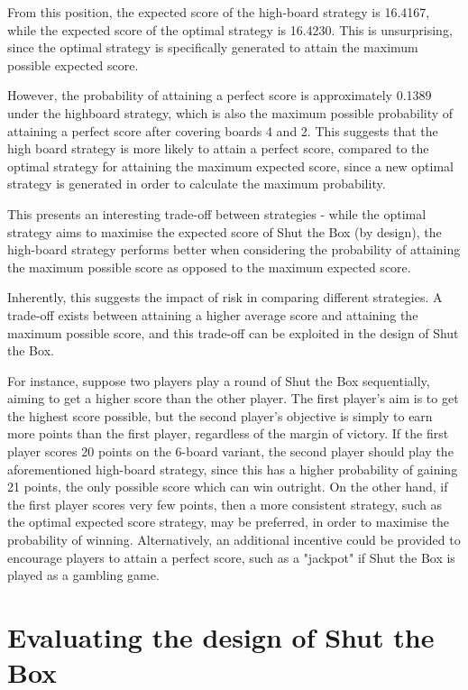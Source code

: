 \begin{example}
From this position, the expected score of the high-board strategy is 16.4167, while the expected score of the optimal strategy is 16.4230. This is unsurprising, since the optimal strategy is specifically generated to attain the maximum possible expected score.

However, the probability of attaining a perfect score is approximately 0.1389 under the highboard strategy, which is also the maximum possible probability of attaining a perfect score after covering boards 4 and 2. This suggests that the high board strategy is more likely to attain a perfect score, compared to the optimal strategy for attaining the maximum expected score, since a new optimal strategy is generated in order to calculate the maximum probability.

\end{example}

This presents an interesting trade-off between strategies - while the optimal strategy aims to maximise the expected score of Shut the Box (by design), the high-board strategy performs better when considering the probability of attaining the maximum possible score as opposed to the maximum expected score.

Inherently, this suggests the impact of risk in comparing different strategies. A trade-off exists between attaining a higher average score and attaining the maximum possible score, and this trade-off can be exploited in the design of Shut the Box.

For instance, suppose two players play a round of Shut the Box sequentially, aiming to get a higher score than the other player. The first player's aim is to get the highest score possible, but the second player's objective is simply to earn more points than the first player, regardless of the margin of victory. If the first player scores 20 points on the 6-board variant, the second player should play the aforementioned high-board strategy, since this has a higher probability of gaining 21 points, the only possible score which can win outright. On the other hand, if the first player scores very few points, then a more consistent strategy, such as the optimal expected score strategy, may be preferred, in order to maximise the probability of winning. Alternatively, an additional incentive could be provided to encourage players to attain a perfect score, such as a "jackpot" if Shut the Box is played as a gambling game.

\section{Evaluating the design of Shut the Box}


